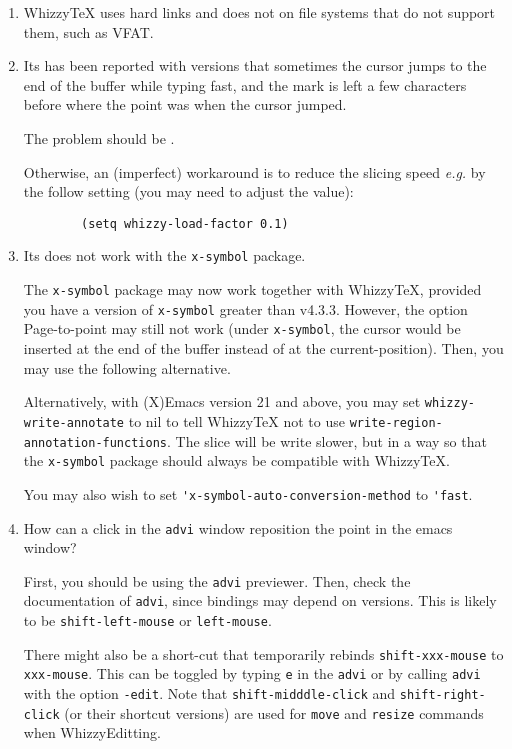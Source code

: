 \documentclass{article}
\def \WhizzyTeX{Whizzy\TeX}
\let \lst \verb
\begin{document}
\begin {enumerate}

\item
{\WhizzyTeX} uses hard links and does not on file systems that do not
support them, such as VFAT. 

\item
Its has been reported with versions that sometimes the cursor jumps to the
end of the buffer while typing fast, and the mark is left a few characters
before where the point was when the cursor jumped.

The problem should be \FIXED. 

Otherwise, an (imperfect) workaround is to reduce the slicing speed
\emph{e.g.}  by the follow setting (you may need to adjust the value):
\begin{verbatim}
        (setq whizzy-load-factor 0.1)
\end{verbatim}


\item Its does not work with the  \lst"x-symbol" package.

The \lst"x-symbol" package may now work together with {\WhizzyTeX}, provided
you have a version of {\tt x-symbol} greater than v4.3.3.  However, the
option Page-to-point may still not work (under \lst"x-symbol", the cursor
would be inserted at the end of the buffer instead of at the
current-position).  Then, you may use the following alternative.

Alternatively, with (X)Emacs version 21 and above, you may set
\lst"whizzy-write-annotate" to nil to tell {\WhizzyTeX} not to use
\lst"write-region-annotation-functions". The slice will be write slower, but
in a way so that the \lst"x-symbol" package should always be compatible with 
{\WhizzyTeX}. 

You may also wish to set \lst"'x-symbol-auto-conversion-method" to
\lst"'fast".

\item How can a click in the \lst"advi" window reposition the point
in the emacs window?

First, you should be using the \lst"advi" previewer.  Then, check the
documentation of \lst"advi", since bindings may depend on versions. This is
likely to be \lst"shift-left-mouse" or \lst"left-mouse".

There might also be a short-cut that temporarily rebinds
\lst"shift-xxx-mouse" to \lst"xxx-mouse". This can be toggled by typing
\lst"e"   in the \lst"advi" or by calling \lst"advi" with the option
\lst"-edit". 
%
Note that \lst"shift-midddle-click" and \lst"shift-right-click" (or their
shortcut versions) are used for \lst"move" and \lst"resize" commands when
WhizzyEditting.


\end {enumerate}
\end{document}
